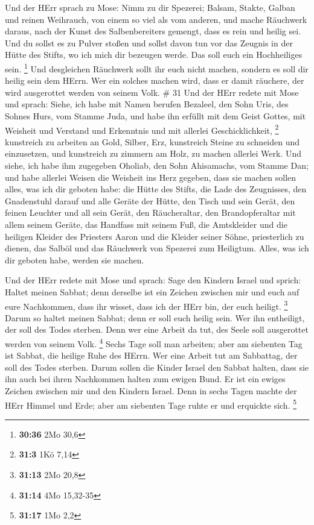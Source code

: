  Und der HErr sprach zu Mose: Nimm zu dir Spezerei; Balsam,
Stakte, Galban und reinen Weihrauch, von einem so viel als vom anderen,
 und mache Räuchwerk daraus, nach der Kunst des
Salbenbereiters gemengt, dass es rein und heilig sei.  Und
du sollst es zu Pulver stoßen und sollst davon tun vor das Zeugnis in
der Hütte des Stifts, wo ich mich dir bezeugen werde. Das soll euch ein
Hochheiliges sein. \footnote{\textbf{30:36} 2Mo 30,6}  Und
desgleichen Räuchwerk sollt ihr euch nicht machen, sondern es soll dir
heilig sein dem HErrn.  Wer ein solches machen wird, dass
er damit räuchere, der wird ausgerottet werden von seinem Volk. \# 31
 Und der HErr redete mit Mose und sprach: 
Siehe, ich habe mit Namen berufen Bezaleel, den Sohn Uris, des Sohnes
Hurs, vom Stamme Juda,  und habe ihn erfüllt mit dem Geist
Gottes, mit Weisheit und Verstand und Erkenntnis und mit allerlei
Geschicklichkeit, \footnote{\textbf{31:3} 1Kö 7,14} 
kunstreich zu arbeiten an Gold, Silber, Erz,  kunstreich
Steine zu schneiden und einzusetzen, und kunstreich zu zimmern am Holz,
zu machen allerlei Werk.  Und siehe, ich habe ihm zugegeben
Oholiab, den Sohn Ahisamachs, vom Stamme Dan; und habe allerlei Weisen
die Weisheit ins Herz gegeben, dass sie machen sollen alles, was ich dir
geboten habe:  die Hütte des Stifts, die Lade des
Zeugnisses, den Gnadenstuhl darauf und alle Geräte der Hütte,
 den Tisch und sein Gerät, den feinen Leuchter und all sein
Gerät, den Räucheraltar,  den Brandopferaltar mit allem
seinem Geräte, das Handfass mit seinem Fuß,  die
Amtskleider und die heiligen Kleider des Priesters Aaron und die Kleider
seiner Söhne, priesterlich zu dienen,  das Salböl und das
Räuchwerk von Spezerei zum Heiligtum. Alles, was ich dir geboten habe,
werden sie machen.

 Und der HErr redete mit Mose und sprach: 
Sage den Kindern Israel und sprich: Haltet meinen Sabbat; denn derselbe
ist ein Zeichen zwischen mir und euch auf eure Nachkommen, dass ihr
wisset, dass ich der HErr bin, der euch heiligt. \footnote{\textbf{31:13}
  2Mo 20,8}  Darum so haltet meinen Sabbat; denn er soll
euch heilig sein. Wer ihn entheiligt, der soll des Todes sterben. Denn
wer eine Arbeit da tut, des Seele soll ausgerottet werden von seinem
Volk. \footnote{\textbf{31:14} 4Mo 15,32-35}  Sechs Tage
soll man arbeiten; aber am siebenten Tag ist Sabbat, die heilige Ruhe
des HErrn. Wer eine Arbeit tut am Sabbattag, der soll des Todes sterben.
 Darum sollen die Kinder Israel den Sabbat halten, dass sie
ihn auch bei ihren Nachkommen halten zum ewigen Bund.  Er
ist ein ewiges Zeichen zwischen mir und den Kindern Israel. Denn in
sechs Tagen machte der HErr Himmel und Erde; aber am siebenten Tage
ruhte er und erquickte sich. \footnote{\textbf{31:17} 1Mo 2,2}

